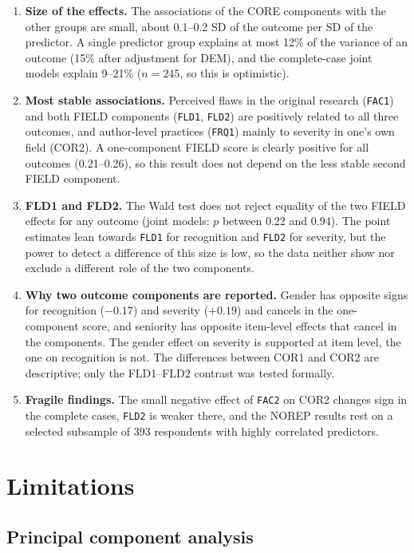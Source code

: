 \documentclass[11pt,a4paper]{article}
\newcommand{\var}[1]{\texttt{#1}}
\begin{document}
\begin{enumerate}
\item \textbf{Size of the effects.} The associations of the CORE components with the other groups are small, about 0.1--0.2 SD of the outcome per SD of the predictor. A single predictor group explains at most 12\% of the variance of an outcome (15\% after adjustment for DEM), and the complete-case joint models explain 9--21\% ($n=245$, so this is optimistic).
\item \textbf{Most stable associations.} Perceived flaws in the original research (\var{FAC1}) and both FIELD components (\var{FLD1}, \var{FLD2}) are positively related to all three outcomes, and author-level practices (\var{FRQ1}) mainly to severity in one's own field (COR2). A one-component FIELD score is clearly positive for all outcomes (0.21--0.26), so this result does not depend on the less stable second FIELD component.
\item \textbf{FLD1 and FLD2.} The Wald test does not reject equality of the two FIELD effects for any outcome (joint models: $p$ between 0.22 and 0.94). The point estimates lean towards \var{FLD1} for recognition and \var{FLD2} for severity, but the power to detect a difference of this size is low, so the data neither show nor exclude a different role of the two components.
\item \textbf{Why two outcome components are reported.} Gender has opposite signs for recognition ($-0.17$) and severity ($+0.19$) and cancels in the one-component score, and seniority has opposite item-level effects that cancel in the components. The gender effect on severity is supported at item level, the one on recognition is not. The differences between COR1 and COR2 are descriptive; only the FLD1--FLD2 contrast was tested formally.
\item \textbf{Fragile findings.} The small negative effect of \var{FAC2} on COR2 changes sign in the complete cases, \var{FLD2} is weaker there, and the NOREP results rest on a selected subsample of 393 respondents with highly correlated predictors.
\end{enumerate}

\section{Limitations}

\subsection{Principal component analysis}
\end{document}
